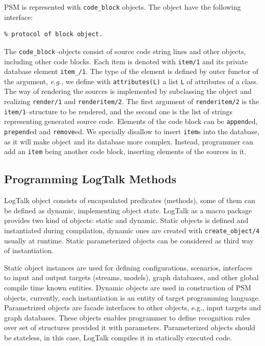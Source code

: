 \documentclass[12pt,a4paper]{llncs}
\begin{document}
PSM is represented with \texttt{code\_block} objects.  The object have the following interface:
\begin{verbatim}
% protocol of block object.
\end{verbatim}

The \verb|code_block|--objects consist of source code string lines and other objects, including other code blocks. Each item is denoted with \verb|item/1| and its private database element \verb|item_/1|.  The type of the element is defined by outer functor of the argument, \emph{e.g.}, we define with \verb|attributes(L)| a list \verb|L| of attributes of a class.  The way of rendering the sources is implemented by subclassing the object and realizing \verb|render/1| and \verb|renderitem/2|.  The first argument of \verb|renderitem/2| is the \verb|item/1|--structure to be rendered, and the second one is the list of strings representing generated source code.  Elements of the code block can be \verb|append|ed, \verb|prepend|ed and \verb|remove|ed.  We specially disallow to insert \verb|item|s into the database, as it will make object and its database more complex.  Instead, programmer can add an \verb|item| being another code block, inserting elements of the sources in it.


\subsection{Programming LogTalk Methods}
\label{sec:lgt-methods}

LogTalk object consists of encapsulated predicates (methods), some of them can be defined as dynamic, implementing object state.  LogTalk as a macro package provides two kind of objects: static and dynamic.  Static objects is defined and instantiated during compilation, dynamic ones are created with \texttt{create\_object/4} usually at runtime.  Static parameterized objects can be considered as third way of instantiation.

Static object instances are used for defining configurations, scenarios, interfaces to input and output targets (streams, models), graph databases, and other global compile time known entities.  Dynamic objects are used in construction of PSM objects, currently, each instantiation is an entity of target programming language.  Parametrized objects are facade interfaces to other objects, e.g., input targets and graph databases.  These objects enables programmer to define recognition rules over set of structures provided it with parameters.  Parameterized objects should be stateless, in this case, LogTalk compiles it in statically executed code.
\end{document}
